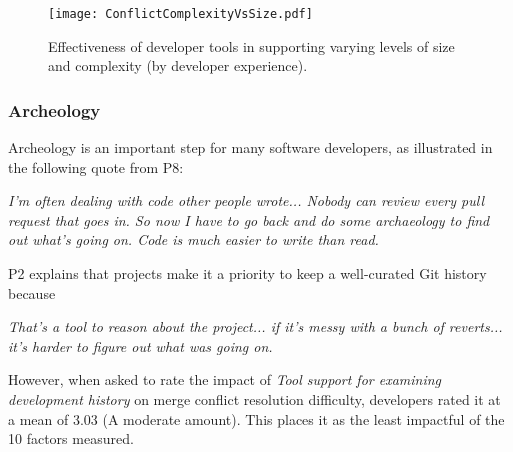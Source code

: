 \begin{figure*}[!t]
\centering
\texttt{[image: ConflictComplexityVsSize.pdf]}
\caption{Effectiveness of developer tools in supporting varying levels of size and complexity (by developer experience).}
\label{size_vs_complexity}
\end{figure*}

\subsubsection{Archeology}
Archeology is an important step for many software developers, as illustrated in the following quote from P8:
\begin{displayquote}
\textit{I'm often dealing with code other people wrote... Nobody can review every pull request that goes in. So now I have to go back and do some archaeology to find out what's going on. Code is much easier to write than read.}
\end{displayquote}
P2 explains that projects make it a priority to keep a well-curated Git history because
\begin{displayquote}
\textit{That's a tool to reason about the project... if it's messy with a bunch of reverts... it's harder to figure out what was going on.	}
\end{displayquote}

However, when asked to rate the impact of \textit{Tool support for examining development history} on merge conflict resolution difficulty, developers rated it at a mean of 3.03 (A moderate amount). This places it as the least impactful of the 10 factors measured.

